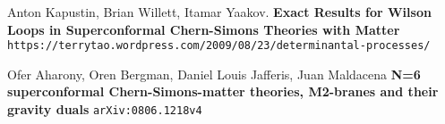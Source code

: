 \documentclass[12pt]{article}
\begin{document}
\begin{thebibliography}{}


\item Anton Kapustin, Brian Willett, Itamar Yaakov.  \textbf{Exact Results for Wilson Loops in Superconformal Chern-Simons Theories with Matter } \\ \texttt{https://terrytao.wordpress.com/2009/08/23/determinantal-processes/}

\item Ofer Aharony, Oren Bergman, Daniel Louis Jafferis, Juan Maldacena \textbf{N=6 superconformal Chern-Simons-matter theories, M2-branes and their gravity duals}
\texttt{arXiv:0806.1218v4}


\end{thebibliography}
\end{document}
